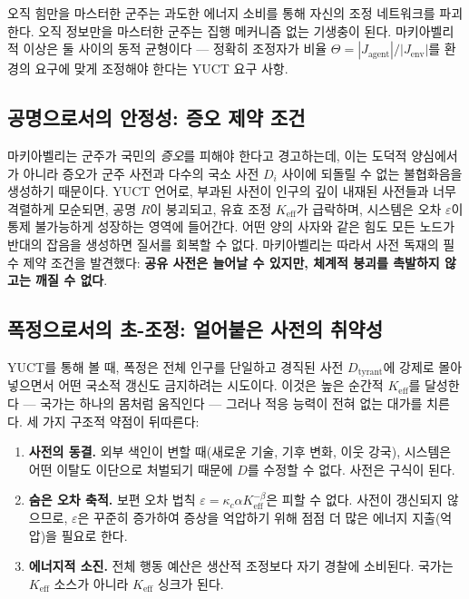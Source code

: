 \documentclass[12pt,a4paper]{article}
\newcommand{\Keff}{K_{\mathrm{eff}}}
\begin{document}
	오직 힘만을 마스터한 군주는 과도한 에너지 소비를 통해 자신의 조정 네트워크를 파괴한다. 오직 정보만을 마스터한 군주는 집행 메커니즘 없는 기생충이 된다. 마키아벨리적 이상은 둘 사이의 동적 균형이다 — 정확히 조정자가 비율 \(\Theta = |J_{\mathrm{agent}}|/|J_{\mathrm{env}}|\)를 환경의 요구에 맞게 조정해야 한다는 YUCT 요구 사항.
	
	\subsection{공명으로서의 안정성: 증오 제약 조건}
	
	마키아벨리는 군주가 국민의 \emph{증오}를 피해야 한다고 경고하는데, 이는 도덕적 양심에서가 아니라 증오가 군주 사전과 다수의 국소 사전 \(D_i\) 사이에 되돌릴 수 없는 불협화음을 생성하기 때문이다. YUCT 언어로, 부과된 사전이 인구의 깊이 내재된 사전들과 너무 격렬하게 모순되면, 공명 \(R\)이 붕괴되고, 유효 조정 \(\Keff\)가 급락하며, 시스템은 오차 \(\varepsilon\)이 통제 불가능하게 성장하는 영역에 들어간다. 어떤 양의 사자와 같은 힘도 모든 노드가 반대의 잡음을 생성하면 질서를 회복할 수 없다. 마키아벨리는 따라서 사전 독재의 필수 제약 조건을 발견했다: \textbf{공유 사전은 늘어날 수 있지만, 체계적 붕괴를 촉발하지 않고는 깨질 수 없다}.
	
	\subsection{폭정으로서의 초-조정: 얼어붙은 사전의 취약성}
	
	YUCT를 통해 볼 때, 폭정은 전체 인구를 단일하고 경직된 사전 \(D_{\text{tyrant}}\)에 강제로 몰아넣으면서 어떤 국소적 갱신도 금지하려는 시도이다. 이것은 높은 순간적 \(\Keff\)를 달성한다 — 국가는 하나의 몸처럼 움직인다 — 그러나 적응 능력이 전혀 없는 대가를 치른다. 세 가지 구조적 약점이 뒤따른다:
	
	\begin{enumerate}[leftmargin=*]
		\item \textbf{사전의 동결.} 외부 색인이 변할 때(새로운 기술, 기후 변화, 이웃 강국), 시스템은 어떤 이탈도 이단으로 처벌되기 때문에 \(D\)를 수정할 수 없다. 사전은 구식이 된다.
		\item \textbf{숨은 오차 축적.} 보편 오차 법칙 \(\varepsilon = \kappa_c \alpha \Keff^{-\beta}\)은 피할 수 없다. 사전이 갱신되지 않으므로, \(\varepsilon\)은 꾸준히 증가하여 증상을 억압하기 위해 점점 더 많은 에너지 지출(억압)을 필요로 한다.
		\item \textbf{에너지적 소진.} 전체 행동 예산은 생산적 조정보다 자기 경찰에 소비된다. 국가는 \(K_{\mathrm{eff}}\) 소스가 아니라 \(K_{\mathrm{eff}}\) 싱크가 된다.
	\end{enumerate}
	
\end{document}
